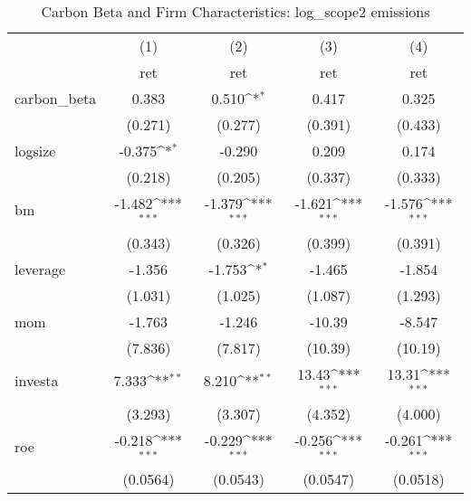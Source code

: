 \begin{table}[htbp]\centering
\def\sym#1{\ifmmode^{#1}\else\(^{#1}\)\fi}
\caption{Carbon Beta and Firm Characteristics: log\_scope2 emissions}
\begin{tabular}{l*{4}{c}}
\hline\hline
                    &\multicolumn{1}{c}{(1)}&\multicolumn{1}{c}{(2)}&\multicolumn{1}{c}{(3)}&\multicolumn{1}{c}{(4)}\\
                    &\multicolumn{1}{c}{ret}&\multicolumn{1}{c}{ret}&\multicolumn{1}{c}{ret}&\multicolumn{1}{c}{ret}\\
\hline
carbon\_beta         &       0.383         &       0.510\sym{*}  &       0.417         &       0.325         \\
                    &     (0.271)         &     (0.277)         &     (0.391)         &     (0.433)         \\
[1em]
logsize             &      -0.375\sym{*}  &      -0.290         &       0.209         &       0.174         \\
                    &     (0.218)         &     (0.205)         &     (0.337)         &     (0.333)         \\
[1em]
bm                  &      -1.482\sym{***}&      -1.379\sym{***}&      -1.621\sym{***}&      -1.576\sym{***}\\
                    &     (0.343)         &     (0.326)         &     (0.399)         &     (0.391)         \\
[1em]
leverage            &      -1.356         &      -1.753\sym{*}  &      -1.465         &      -1.854         \\
                    &     (1.031)         &     (1.025)         &     (1.087)         &     (1.293)         \\
[1em]
mom                 &      -1.763         &      -1.246         &      -10.39         &      -8.547         \\
                    &     (7.836)         &     (7.817)         &     (10.39)         &     (10.19)         \\
[1em]
investa             &       7.333\sym{**} &       8.210\sym{**} &       13.43\sym{***}&       13.31\sym{***}\\
                    &     (3.293)         &     (3.307)         &     (4.352)         &     (4.000)         \\
[1em]
roe                 &      -0.218\sym{***}&      -0.229\sym{***}&      -0.256\sym{***}&      -0.261\sym{***}\\
                    &    (0.0564)         &    (0.0543)         &    (0.0547)         &    (0.0518)         \\

\end{tabular}
\end{table}
